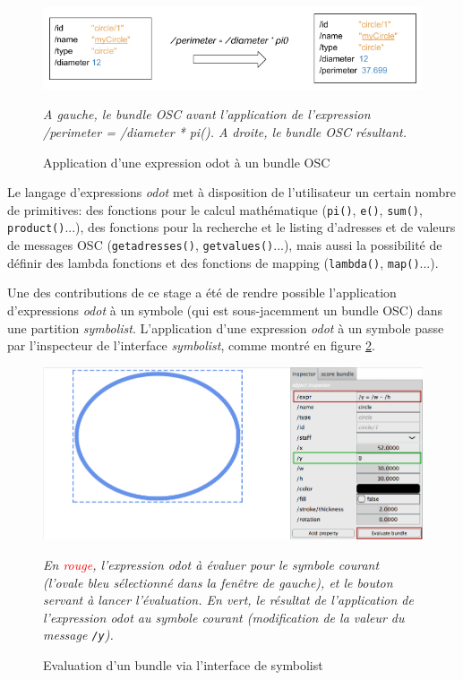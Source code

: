 \begin{figure}[H]
	\centering
	\includegraphics[keepaspectratio=true, width=\textwidth]{ModeleDeNotation/i/applyOdotExpr.png}
	\caption{Application d'une expression odot à un bundle OSC}
	\label{fig:applyOdotExpr}
	\small
	\textit{A gauche, le bundle OSC avant l'application de l'expression \emph{/perimeter = /diameter * pi()}. A droite, le bundle OSC résultant.}
\end{figure}

Le langage d'expressions \textit{odot} met à disposition de l'utilisateur un certain nombre de primitives: des fonctions pour le calcul mathématique (\texttt{pi()}, \texttt{e()}, \texttt{sum()}, \texttt{product()}...), des fonctions pour la recherche et le listing d'adresses et de valeurs de messages OSC (\texttt{getadresses()}, \texttt{getvalues()}...), mais aussi la possibilité de définir des lambda fonctions et des fonctions de mapping (\texttt{lambda()}, \texttt{map()}...).

Une des contributions de ce stage a été de rendre possible l'application d'expressions \textit{odot} à un symbole (qui est sous-jacemment un bundle OSC) dans une partition \textit{symbolist}. L'application d'une expression \textit{odot} à un symbole passe par l'inspecteur de l'interface \textit{symbolist}, comme montré en figure \ref{fig:evaluateBundle}.

\begin{figure}[H]
	\centering
	\includegraphics[keepaspectratio=true, width=\textwidth]{ModeleDeNotation/i/evaluateBundle.png}
	\caption{Evaluation d'un bundle via l'interface de symbolist}
	\label{fig:evaluateBundle}
	\small
	\textit{En \textcolor{red}{rouge}, l'expression \emph{odot} à évaluer pour le symbole courant (l'ovale bleu sélectionné dans la fenêtre de gauche), et le bouton servant à lancer l'évaluation. En vert, le résultat de l'application de l'expression \emph{odot} au symbole courant (modification de la valeur du message \texttt{/y}).}
\end{figure}

